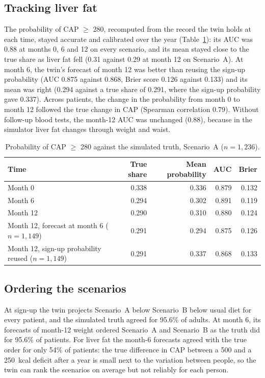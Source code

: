 \subsection{Tracking liver fat}

The probability of CAP $\geq$ 280, recomputed from the record the twin holds
at each time, stayed accurate and calibrated over the year
(Table~\ref{tab:r_liver}): its AUC was 0.88 at months 0, 6 and 12 on every
scenario, and its mean stayed close to the true share as liver fat fell (0.31
against 0.29 at month 12 on Scenario~A). At month 6, the twin's forecast of
month 12 was better than reusing the sign-up probability (AUC 0.875 against
0.868, Brier score 0.126 against 0.133) and its mean was right (0.294 against
a true share of 0.291, where the sign-up probability gave 0.337). Across
patients, the change in the probability from month 0 to month 12 followed the
true change in CAP (Spearman correlation 0.79). Without follow-up blood tests,
the month-12 AUC was unchanged (0.88), because in the simulator liver fat
changes through weight and waist.

\begin{table}[htbp]
\centering
\caption{Probability of CAP $\geq$ 280 against the simulated truth, Scenario~A ($n = 1{,}236$).}
\label{tab:r_liver}
\begin{tabular}{p{6.2cm}rrrr}
\toprule
Time & True share & Mean probability & AUC & Brier \\
\midrule
Month 0 & 0.338 & 0.336 & 0.879 & 0.132 \\
Month 6 & 0.294 & 0.302 & 0.891 & 0.119 \\
Month 12 & 0.290 & 0.310 & 0.880 & 0.124 \\
Month 12, forecast at month 6 ($n = 1{,}149$) & 0.291 & 0.294 & 0.875 & 0.126 \\
Month 12, sign-up probability reused ($n = 1{,}149$) & 0.291 & 0.337 & 0.868 & 0.133 \\
\bottomrule
\end{tabular}
\end{table}

\subsection{Ordering the scenarios}

At sign-up the twin projects Scenario~A below Scenario~B below usual diet for
every patient, and the simulated truth agreed for 95.6\% of adults. At month
6, its forecasts of month-12 weight ordered Scenario~A and Scenario~B as the
truth did for 95.6\% of patients. For liver fat the month-6 forecasts agreed
with the true order for only 54\% of patients: the true difference in CAP
between a 500 and a 250~kcal deficit after a year is small next to the
variation between people, so the twin can rank the scenarios on average but not
reliably for each person.

